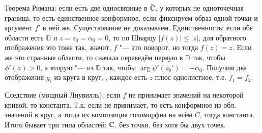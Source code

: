 	Теорема Римана: если есть две односвязные в $\bar {\mathbb{C}}$, у которых не одноточечная граница,
	то есть единственное конформное, если фиксируем образ одной точки и аргумент $f'$ в ней же.
	Существование не доказываем.
	Единственность: если обе области есть $\mathbb{D}$ и $z=z_0=\alpha_0=0$, то
	по Шварцу $|f(z)| \le |z|$, для обратного отображения это тоже так,
	значит, $f$ "--- это поворот, но тогда $f(z)=z$.
	Если же это странные области, то сначала переведём первую в $\mathbb{D}$ так, чтобы $\phi'(a) > 0$,
	а вторую "--- из $\mathbb{D}$ так, чтобы $\arg \psi'(z_0')=-\alpha_0$.
	Получим два отображения $g_i$ из круга в круг, \TODO, каждое есть $z$ плюс однолистное, т.е. $f_1=f_2$.

	Следствие (мощный Лиувилль): если $f$ не принимает значений на некоторой кривой, то константа.
    Т.к. если не принимает, то есть конформное из обл. значений в круг, а тогда их композиция
    голоморфна на всём $\bar C$, тогда константа.
    Итого бывает три типа областей: $\bar {\mathbb{C}}$, без точки, без хотя бы двух точек.
